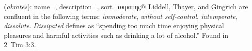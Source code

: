 \item[Dissipated,]

(\textit{akratēs}):
{
    name=,
    description={},
    sort=ακρατης@
}
Liddell, Thayer, and Gingrich are confluent in the following terms: \emph{immoderate}, \emph{without self-control}, \emph{intemperate}, \emph{dissolute}. \emph{Dissipated} defines as ``spending too much time enjoying physical pleasures and harmful activities such as drinking a lot of alcohol.''
Found in 2~Tim 3:3.
